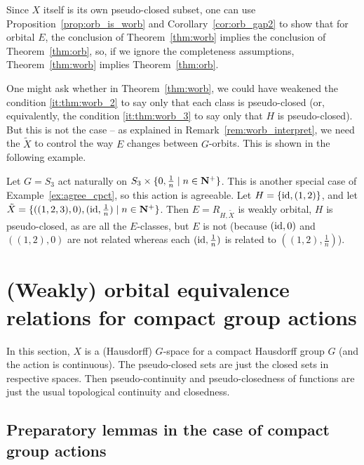 	\begin{rem}
		Since $X$ itself is its own pseudo-closed subset, one can use Proposition~\ref{prop:orb_is_worb} and Corollary~\ref{cor:orb_gap2} to show that for orbital $E$, the conclusion of Theorem~\ref{thm:worb} implies the conclusion of Theorem~\ref{thm:orb}, so, if we ignore the completeness assumptions, Theorem~\ref{thm:worb} implies Theorem~\ref{thm:orb}.\xqed{\lozenge}
	\end{rem}
	
	One might ask whether in Theorem~\ref{thm:worb}, we could have weakened the condition \ref{it:thm:worb_2} to say only that each class is pseudo-closed (or, equivalently, the condition \ref{it:thm:worb_3} to say only that $H$ is pseudo-closed). But this is not the case -- as explained in Remark~\ref{rem:worb_interpret}, we need the $\tilde X$ to control the way $E$ changes between $G$-orbits. This is shown in the following example.
	
	\begin{ex}
		Let $G=S_3$ act naturally on $S_3\times \{0,\frac{1}{n}\mid n\in {\bf N}^+ \}$. This is another special case of Example~\ref{ex:agree_cpct}, so this action is agreeable. Let $H=\{{\operatorname{{id}}},(1,2) \}$, and let $\tilde X=\{((1,2,3),0),({\operatorname{{id}}},\frac{1}{n})\mid n\in {\bf N}^+\}$. Then $E=R_{H,\tilde X}$ is weakly orbital, $H$ is pseudo-closed, as are all the $E$-classes, but $E$ is not (because $({\operatorname{{id}}},0)$ and $((1,2),0)$ are not related whereas each $({\operatorname{{id}}},\frac{1}{n})$ is related to $((1,2),\frac{1}{n})$).\xqed{\lozenge}
	\end{ex}
	
	
	
	
	
	
	\section[Compact group actions]{(Weakly) orbital equivalence relations for compact group actions}
	\label{sec:cpct}
	
	In this section, $X$ is a (Hausdorff) $G$-space for a compact Hausdorff group $G$ (and the action is continuous). The pseudo-closed sets are just the closed sets in respective spaces. Then pseudo-continuity and pseudo-closedness of functions are just the usual topological continuity and closedness.
	
	\subsection*{Preparatory lemmas in the case of compact group actions}
	
